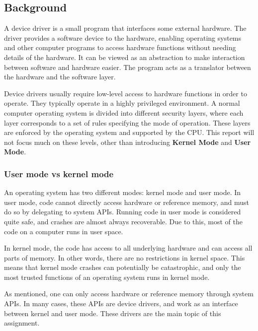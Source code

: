 \subsection{Background}
A device driver is a small program that interfaces some external hardware. The driver provides a software device to the hardware, enabling operating systems and other computer programs to access hardware functions without needing details of the hardware. It can be viewed as an abstraction to make interaction between software and hardware easier. The program acts as a translator between the hardware and the software layer. 

Device drivers usually require low-level access to hardware functions in order to operate. They typically operate in a highly privileged environment. A normal computer operating system is divided into different security layers, where each layer corresponds to a set of rules specifying the mode of operation. These layers are enforced by the operating system and supported by the CPU. This report will not focus much on these levels, other than introducing {\bf Kernel Mode} and {\bf User Mode}. 

\subsubsection{User mode vs kernel mode}
An operating system has two different modes: kernel mode and user mode. In user mode, code cannot directly access hardware or reference memory, and must do so by delegating to system APIs. Running code in user mode is considered quite safe, and crashes are almost always recoverable. Due to this, most of the code on a computer runs in user space. 

In kernel mode, the code has access to all underlying hardware and can access all parts of memory. In other words, there are no restrictions in kernel space. This means that kernel mode crashes can potentially be catastrophic, and only the most trusted functions of an operating system runs in kernel mode. 

As mentioned, one can only access hardware or reference memory through system APIs. In many cases, these APIs are device drivers, and work as an interface between kernel and user mode. These drivers are the main topic of this assignment.

